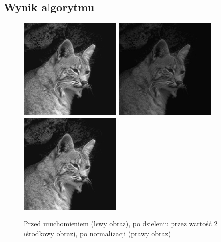 \documentclass[a4paper,12pt]{book}
\begin{document}
\subsection*{Wynik algorytmu}
\begin{figure}[H]
	\caption{Przed uruchomieniem (lewy obraz), po dzieleniu przez wartość 2 (środkowy obraz), po normalizacji (prawy obraz)}
	\includegraphics[width=5cm, height=5cm]{cat-unmodified.jpg}
	\includegraphics[width=5cm, height=5cm]{2-5/divide-gray-const-cat-2.png}
	\includegraphics[width=5cm, height=5cm]{2-5/divide-gray-const-cat-2-norm.png}
\end{figure}
\end{document}
